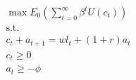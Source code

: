 \begin{align}
	\max E_0\left(\sum_{t=0}^\infty \beta^t U(c_t)\right)\\
	\text{s.t.}\\
	c_t+a_{t+1}=wl_{t}+(1+r)a_t \\
	c_t\geq0\\
	a_t\geq-\phi
\end{align} \\